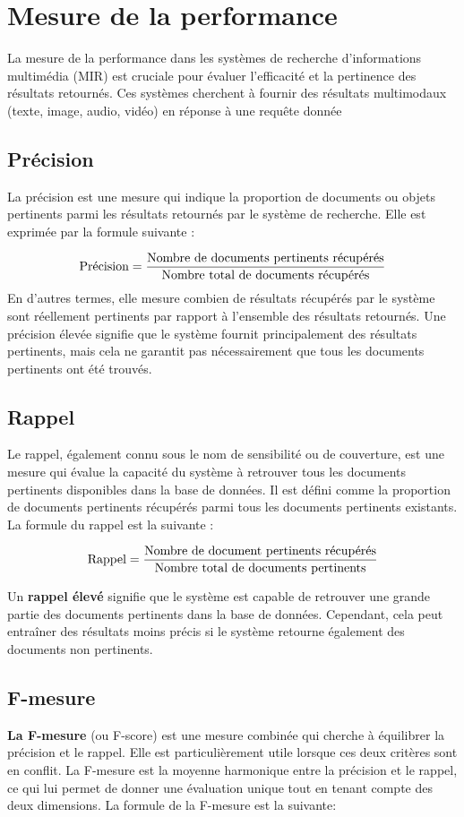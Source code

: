 \begin{section}
 \section{Mesure de la performance}
 La mesure de la performance dans les systèmes de recherche d'informations multimédia (MIR) est cruciale pour évaluer l'efficacité et la pertinence des résultats retournés. Ces systèmes cherchent à fournir des résultats multimodaux (texte, image, audio, vidéo) en réponse à une requête donnée
 \subsection{Précision}
 La précision est une mesure qui indique la proportion de documents ou objets
 pertinents parmi les résultats retournés par le système de recherche. Elle est
 exprimée par la formule suivante :

 \[
   \text{Précision} = \frac{\text{Nombre de documents pertinents récupérés}}{\text{Nombre total de documents récupérés}}
   \vspace{1cm}
 \]
 En d'autres termes, elle mesure combien de résultats récupérés par le système
 sont réellement pertinents par rapport à l'ensemble des résultats retournés.
 Une précision élevée signifie que le système fournit principalement des
 résultats pertinents, mais cela ne garantit pas nécessairement que tous les
 documents pertinents ont été trouvés.

 \subsection{Rappel}
 Le rappel, également connu sous le nom de sensibilité ou de couverture, est une
 mesure qui évalue la capacité du système à retrouver tous les documents
 pertinents disponibles dans la base de données. Il est défini comme la
 proportion de documents pertinents récupérés parmi tous les documents
 pertinents existants. La formule du rappel est la suivante :

 \[
   \text{Rappel}=\frac{\text{Nombre de document pertinents récupérés}}{\text{Nombre total de documents pertinents}}
   \vspace{1cm}
 \]

 Un \textbf{rappel élevé} signifie que le système est capable de retrouver une
 grande partie des documents pertinents dans la base de données. Cependant, cela
 peut entraîner des résultats moins précis si le système retourne également des
 documents non pertinents.
 \subsection{F-mesure}
 \textbf{La F-mesure} (ou F-score) est une mesure combinée qui cherche à équilibrer la
 précision et le rappel. Elle est particulièrement utile lorsque ces deux
 critères sont en conflit. La F-mesure est la moyenne harmonique entre la
 précision et le rappel, ce qui lui permet de donner une évaluation unique tout
 en tenant compte des deux dimensions. La formule de la F-mesure est la suivante:
 \par


\end{section}
